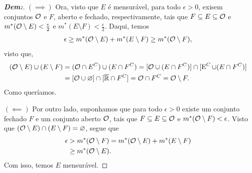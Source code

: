 \bigline
\begin{proof}[\textbf{Dem:}]
  \hfill 
  
  \noindent 
  $(\implies)$ Ora, visto que $E$ é mensurável, para todo $\epsilon > 0$, exisem conjuntos 
  $\mathcal O$ e $F$, aberto e fechado, respectivamente, tais que 
  $F\subseteq E \subseteq \mathcal O$ e $m^*(\mathcal O\setminus E) < \frac{\epsilon}{2}$
  e $m^*(E\setminus F) < \frac{\epsilon}{2}$. Daqui, temos
  \begin{align*}
    \epsilon \ge m^*(\mathcal O\setminus E) + m^*(E\setminus F) \ge m^*(\mathcal O \setminus F), 
  \end{align*}
  visto que, 
  \begin{align*}
    (\mathcal O \setminus E) \cup (E \setminus F) &= 
    (\mathcal O \cap E^C) \cup (E \cap F^C) = [\mathcal O \cup (E \cap F^C)] \cap [\operatorname{E}^C \cup 
    (E \cap F^C)]\\ 
    &= [\mathcal O\cup \varnothing] \cap [\overline {\mathbb R} \cap F^C]
    = \mathcal O \cap F^C = \mathcal O \setminus F.
  \end{align*}
  Como queríamos.

  \noindent 
  $(\impliedby)$ Por outro lado, suponhamos que para todo $\epsilon>0$ existe 
  um conjunto fechado $F$ e um conjunto aberto $\mathcal O$, tais que 
  $F \subseteq E \subseteq \mathcal O$ e $m^*(\mathcal O\setminus F) < \epsilon$.
  Visto que $(\mathcal O\setminus E) \cap (E\setminus F) = \varnothing$, segue que 
  \begin{align*}
    \epsilon &> m^*(\mathcal O\setminus F) = m^*(\mathcal O \setminus E) + m^*(E \setminus F)\\
    &\ge m^*(\mathcal O\setminus E).
  \end{align*}
  Com isso, temos $E$ mensurável.
\end{proof}
\biglinend
\newpage
{}
\myexe{\thedois}
\bigline 
